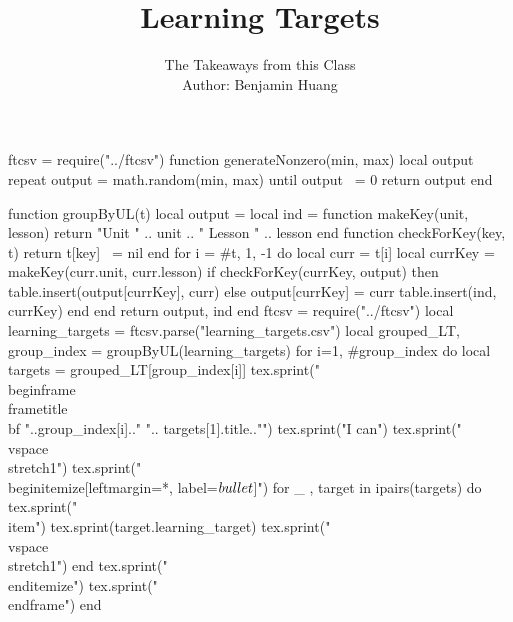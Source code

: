 \documentclass[10pt, aspectratio=169]{beamer}
\author[B.H.]{{\Large The Takeaways from this Class}\\\vspace{.5em} Author: Benjamin Huang}
\date{}
\title[LT]{Learning Targets}
\begin{document}
\begin{luacode*}
ftcsv = require("../ftcsv")
function generateNonzero(min, max)
  local output
  repeat
    output = math.random(min, max)
  until output ~= 0
  return output
end
\end{luacode*}
\frame{\titlepage}
\Large
\begin{luacode*}
function groupByUL(t)
local output = {}
local ind = {}
function makeKey(unit, lesson)
return "Unit " .. unit .. " Lesson " .. lesson
end
function checkForKey(key, t)
return  t[key] ~= nil
end
for i = #t, 1, -1 do
local curr = t[i]
local currKey = makeKey(curr.unit, curr.lesson)
if checkForKey(currKey, output) then
table.insert(output[currKey], curr)
else
output[currKey] = {curr}
table.insert(ind, currKey)
end
end
return output, ind
end
ftcsv = require("../ftcsv")
local learning_targets = ftcsv.parse("learning_targets.csv")
local grouped_LT, group_index = groupByUL(learning_targets)
for i=1, #group_index do
    local targets = grouped_LT[group_index[i]]
    tex.sprint("\\begin{frame}\\frametitle{\\bf "..group_index[i].." ".. targets[1].title.."}")
    tex.sprint("I can")
    tex.sprint("\\vspace{\\stretch{1}}")
    tex.sprint("\\begin{itemize}[leftmargin=*, label=$\\bullet$]")
    for _ , target in ipairs(targets) do	
    tex.sprint("\\item")
    tex.sprint(target.learning_target)
    tex.sprint("\\vspace{\\stretch{1}}")
    end
    tex.sprint("\\end{itemize}")
    tex.sprint("\\end{frame}")
end
\end{luacode*}
\end{document}

